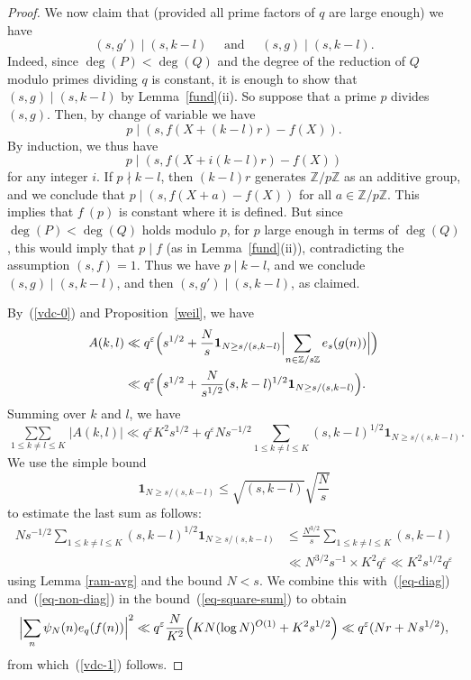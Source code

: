 \documentclass[12pt,a4paper,reqno]{amsart}
\numberwithin{equation}{section}
\theoremstyle{plain}
\theoremstyle{definition}
\newcommand\Z{\mathbb{Z}}
\newcommand\eps{\varepsilon}
\newcommand\sumsum{\mathop{\sum\sum}\limits}
\newcommand{\onef}{\mathbf{1}}
\begin{document}
\begin{proof}
We now claim that (provided all prime factors of $q$ are large enough)
we have 
$$
(s,g')\mid (s,k-l)\quad\text{ and }\quad (s,g)\mid (s,k-l).
$$
Indeed, since $\deg(P)<\deg(Q)$ and the degree of the reduction of $Q$
modulo primes dividing $q$ is constant, it is enough to show that
$(s,g)\mid (s,k-l)$ by Lemma~\ref{fund}(ii). So suppose that a prime
$p$ divides $(s,g)$. Then, by change of variable we have
$$
p\mid (s, f(X+(k-l)r)-f(X)).
$$
By induction, we thus have
$$ p\mid (s, f(X+i(k-l)r)-f(X))$$
for any integer $i$.  If $p\nmid k-l$, then $(k-l)r$ generates $\Z/p\Z$ as an additive group, and we conclude that $p\mid (s,f(X+a)-f(X))$ for all $a\in
\Z/p\Z$. This implies that $f\ (p)$ is constant
where it is defined. But since $\deg(P)<\deg(Q)$ holds modulo $p$, for
$p$ large enough in terms of $\deg(Q)$, this would imply that $p\mid
f$ (as in Lemma~\ref{fund}(ii)), contradicting the assumption
$(s,f)=1$. Thus we have $p\mid k-l$, and we conclude $(s,g)\mid
(s,k-l)$, and then $(s,g')\mid (s,k-l)$, as claimed.

By~(\ref{vdc-0}) and Proposition~\ref{weil}, we have
\begin{align*}
  A(k,l)&\ll q^{\eps}\Bigl(s^{1/2}+\frac{N}{s}\onef_{N\geq s/(s,k-l)}
  \Bigl|\sum_{n\in\Z/s\Z} e_s(g(n))\Bigr|\Bigr)\\
  &\ll q^{\eps}\Bigl(s^{1/2}+\frac{N}{s^{1/2}}
  (s,k-l)^{1/2}\onef_{N\geq s/(s,k-l)}\Bigr).
\end{align*}
Summing over $k$ and $l$, we have
\begin{equation}\label{eq-non-diag}
\sumsum_{1\leq k\neq l\leq K} |A(k,l)| \ll
q^{\eps}K^2s^{1/2}+q^{\eps}Ns^{-1/2} \sum_{1\leq k\neq l\leq K}
(s,k-l)^{1/2}\onef_{N\geq s/(s,k-l)}.
\end{equation}
We use the simple bound
$$
\onef_{N\geq s/(s,k-l)} \leq \sqrt{(s,k-l)} \sqrt{\frac{N}{s}}
$$
to estimate the last sum as follows:
\begin{align*}
  Ns^{-1/2}\sum_{1\leq k\neq l\leq K} (s,k-l)^{1/2}\onef_{N\geq
    s/(s,k-l)}&\leq \frac{N^{3/2}}{s}\sum_{1\leq k\neq l\leq K}
  (s,k-l)\\
&\ll N^{3/2}s^{-1}\times K^2q^{\eps}\ll K^2s^{1/2}q^{\eps}
\end{align*}
using Lemma \ref{ram-avg} and the bound $N<s$. We combine this
with~(\ref{eq-diag}) and~(\ref{eq-non-diag}) in the
bound~(\ref{eq-square-sum}) to obtain
$$
\Bigl|\sum_n \psi_N(n) e_q(f(n))\Bigr|^2\ll  q^{\eps}\frac{N}{K^2}
\Bigl(KN(\log N)^{O(1)}+K^2s^{1/2}\Bigr)\ll
q^{\eps}(Nr+Ns^{1/2}),
$$
from which~(\ref{vdc-1}) follows.
\end{proof}
\end{document}
